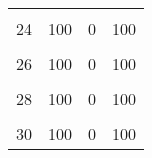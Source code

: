 \documentclass[
]{article}
\begin{document}
\begin{table}[H]
\begin{tabular}{rrrr}
\cellcolor{gray!6}{23} & \cellcolor{gray!6}{100} & \cellcolor{gray!6}{0} & \cellcolor{gray!6}{100}\\
24 & 100 & 0 & 100\\
\cellcolor{gray!6}{25} & \cellcolor{gray!6}{100} & \cellcolor{gray!6}{0} & \cellcolor{gray!6}{100}\\
26 & 100 & 0 & 100\\
\cellcolor{gray!6}{27} & \cellcolor{gray!6}{100} & \cellcolor{gray!6}{0} & \cellcolor{gray!6}{100}\\
28 & 100 & 0 & 100\\
\cellcolor{gray!6}{29} & \cellcolor{gray!6}{100} & \cellcolor{gray!6}{0} & \cellcolor{gray!6}{100}\\
30 & 100 & 0 & 100\\
\bottomrule
\end{tabular}
\end{table}
\end{document}
